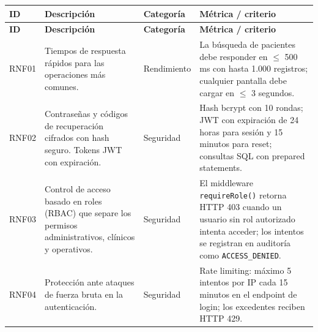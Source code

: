 \documentclass[11pt,a4paper]{article}
\begin{document}
\begin{longtable}{|C{1.2cm}|L{5cm}|L{2.5cm}|L{5cm}|}
    \hline
    \textbf{ID} & \textbf{Descripción}                                                                                     & \textbf{Categoría} & \textbf{Métrica / criterio}                                                                                                                                                                             \\
    \hline
    \endfirsthead

    \hline
    \textbf{ID} & \textbf{Descripción}                                                                                     & \textbf{Categoría} & \textbf{Métrica / criterio}                                                                                                                                                                             \\
    \hline
    \endhead

    RNF01       & Tiempos de respuesta rápidos para las operaciones más comunes.                                           & Rendimiento        & La búsqueda de pacientes debe responder en $\leq$ 500 ms con hasta 1.000 registros; cualquier pantalla debe cargar en $\leq$ 3 segundos.                                                                \\
    \hline

    RNF02       & Contraseñas y códigos de recuperación cifrados con hash seguro. Tokens JWT con expiración.               & Seguridad          & Hash bcrypt con 10 rondas; JWT con expiración de 24 horas para sesión y 15 minutos para reset; consultas SQL con prepared statements.                                                                   \\
    \hline

    RNF03       & Control de acceso basado en roles (RBAC) que separe los permisos administrativos, clínicos y operativos. & Seguridad          & El middleware \texttt{requireRole()} retorna HTTP 403 cuando un usuario sin rol autorizado intenta acceder; los intentos se registran en auditoría como \texttt{ACCESS\_DENIED}.                        \\
    \hline

    RNF04       & Protección ante ataques de fuerza bruta en la autenticación.                                             & Seguridad          & Rate limiting: máximo 5 intentos por IP cada 15 minutos en el endpoint de login; los excedentes reciben HTTP 429.                                                                                       \\
    \hline


\end{longtable}
\end{document}
